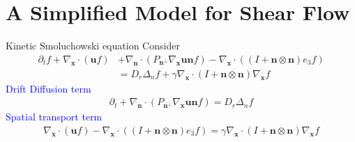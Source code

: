 \section{A Simplified Model for Shear Flow}
\begin{frame}{Kinetic Smoluchowski equation}
	\scriptsize
Consider
\begin{align}
	\partial_t f+\nabla_{\boldsymbol{x}} \cdot(\boldsymbol{u} f) & +\nabla_{\boldsymbol{n}} \cdot\left(P_{\boldsymbol{n}^{\perp}} \nabla_{\boldsymbol{x}} \boldsymbol{u} \boldsymbol{n} f\right)-\nabla_{\boldsymbol{x}} \cdot\left((I+\boldsymbol{n} \otimes \boldsymbol{n}) e_3 f\right) \\ \label{kineticSmoch}
	& =D_r \Delta_n f+\gamma \nabla_{\boldsymbol{x}} \cdot(I+\boldsymbol{n} \otimes \boldsymbol{n}) \nabla_{\boldsymbol{x}} f \nonumber 
\end{align}
	\pause
\textcolor{blue}{Drift Diffusion term}
\begin{align*}
	\partial_t +\nabla_{\boldsymbol{n}} \cdot\left(P_{\boldsymbol{n}^{\perp}}\nabla_{\boldsymbol{x}} \boldsymbol{u} \boldsymbol{n} f\right) =D_r \Delta_n f
\end{align*}
	\pause
\textcolor{blue}{Spatial transport term}
\begin{align*}
	\nabla_{\boldsymbol{x}} \cdot(\boldsymbol{u} f) -\nabla_{\boldsymbol{x}} \cdot\left((I+\boldsymbol{n} \otimes \boldsymbol{n}) e_3 f\right) = \gamma \nabla_{\boldsymbol{x}} \cdot(I+\boldsymbol{n} \otimes \boldsymbol{n}) \nabla_{\boldsymbol{x}} f
\end{align*}
\end{frame}


